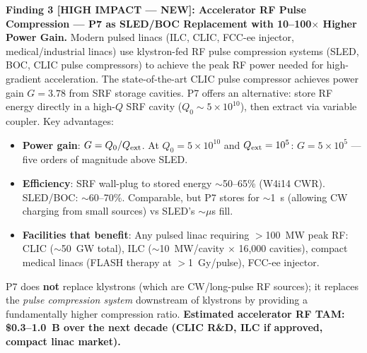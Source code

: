 \documentclass[11pt]{article}
\newcommand{\ee}[1]{\times 10^{#1}}
\begin{document}
\begin{tcolorbox}[colback=blue!5!white, colframe=blue!60!black,
  title=\textbf{W4i16 P7 --- Top 5 Findings (Ranked by Impact)}]
\textbf{Finding 3 [HIGH IMPACT --- NEW]: Accelerator RF Pulse
Compression --- P7 as SLED/BOC Replacement with 10--100$\times$
Higher Power Gain.}
Modern pulsed linacs (ILC, CLIC, FCC-ee injector, medical/industrial
linacs) use klystron-fed RF pulse compression systems (SLED, BOC,
CLIC pulse compressors) to achieve the peak RF power needed for
high-gradient acceleration. The state-of-the-art CLIC pulse
compressor achieves power gain $G = 3.78$ from SRF storage cavities.
P7 offers an alternative: store RF energy directly in a high-$Q$
SRF cavity ($Q_0 \sim 5\ee{10}$), then extract via variable
coupler. Key advantages:
\begin{itemize}[nosep]
  \item \textbf{Power gain}: $G = Q_0/Q_{\rm ext}$. At
    $Q_0 = 5\ee{10}$ and $Q_{\rm ext} = 10^5$:
    $G = 5\ee{5}$ --- five orders of magnitude above SLED.
  \item \textbf{Efficiency}: SRF wall-plug to stored energy
    $\sim$50--65\% (W4i14 CWR). SLED/BOC: $\sim$60--70\%.
    Comparable, but P7 stores for $\sim$1~s (allowing CW
    charging from small sources) vs SLED's $\sim\mu$s fill.
  \item \textbf{Facilities that benefit}: Any pulsed linac
    requiring $>$100~MW peak RF: CLIC ($\sim$50~GW total),
    ILC ($\sim$10~MW/cavity $\times$ 16,000 cavities),
    compact medical linacs (FLASH therapy at $>$1~Gy/pulse),
    FCC-ee injector.
\end{itemize}
P7 does \textbf{not} replace klystrons (which are CW/long-pulse
RF sources); it replaces the \emph{pulse compression system}
downstream of klystrons by providing a fundamentally higher
compression ratio. \textbf{Estimated accelerator RF TAM:
\$0.3--1.0~B over the next decade (CLIC R\&D, ILC if approved,
compact linac market).}


\end{tcolorbox}
\end{document}
